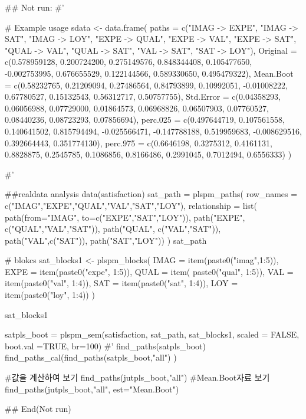 \documentclass[a4paper]{book}
\begin{document}
\begin{Examples}
\begin{ExampleCode}


## Not run: 
#'

# Example usage
sdata <- data.frame(
  paths = c("IMAG -> EXPE", "IMAG -> SAT", "IMAG -> LOY",
   "EXPE -> QUAL", "EXPE -> VAL", "EXPE -> SAT",
            "QUAL -> VAL", "QUAL -> SAT",
            "VAL -> SAT", "SAT -> LOY"),
  Original = c(0.578959128, 0.200724200, 0.275149576,
   0.848344408, 0.105477650, -0.002753995,
               0.676655529, 0.122144566, 0.589330650, 0.495479322),
  Mean.Boot = c(0.58232765, 0.21209094, 0.27486564,
  0.84793899, 0.10992051, -0.01008222,
                0.67780527, 0.15132543, 0.56312717, 0.50757755),
  Std.Error = c(0.04358293, 0.06056988, 0.07729000,
  0.01864573, 0.06968826, 0.06507903,
                0.07760527, 0.08440236, 0.08723293, 0.07856694),
  perc.025 = c(0.497644719, 0.107561558, 0.140641502,
   0.815794494, -0.025566471, -0.147788188,
               0.519959683, -0.008629516, 0.392664443, 0.351774130),
  perc.975 = c(0.6646198, 0.3275312, 0.4161131,
   0.8828875, 0.2545785, 0.1086856,
               0.8166486, 0.2991045, 0.7012494, 0.6556333)
)

#'

##realdata analysis
data(satisfaction)
sat_path = plspm_paths(
  row_names = c("IMAG","EXPE","QUAL","VAL","SAT","LOY"),
  relationship = list(
    path(from="IMAG", to=c("EXPE","SAT","LOY")),
    path("EXPE", c("QUAL","VAL","SAT")),
    path("QUAL", c("VAL","SAT")),
    path("VAL",c("SAT")),
    path("SAT","LOY"))
)
sat_path

# blokcs
sat_blocks1 <- plspm_blocks(
  IMAG = item(paste0("imag",1:5)),
  EXPE = item(paste0("expe", 1:5)),
  QUAL = item( paste0("qual", 1:5)),
  VAL = item(paste0("val", 1:4)),
  SAT = item(paste0("sat", 1:4)),
  LOY = item(paste0("loy", 1:4))
)

sat_blocks1

satpls_boot = plspm_sem(satisfaction, sat_path, sat_blocks1, scaled = FALSE,
                        boot.val =TRUE, br=100)
#' find_paths(satpls_boot)
find_paths_cal(find_paths(satpls_boot,"all") )

#값을 계산하여 보기
find_paths(jutpls_boot,"all")%
#Mean.Boot자료 보기
find_paths(jutpls_boot,"all", est="Mean.Boot")%




## End(Not run)


\end{ExampleCode}
\end{Examples}
\end{document}
